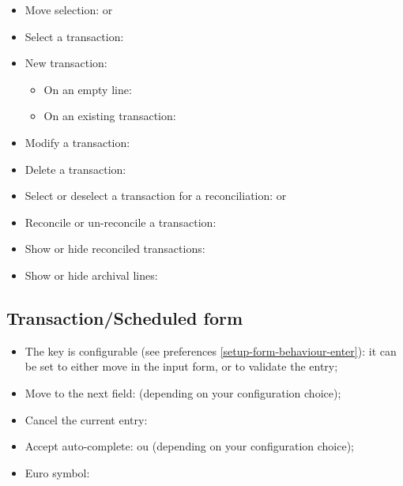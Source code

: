 \begin{itemize}
	\item Move selection: \keys{\arrowkeyup} or \keys{\arrowkeydown}%
	\item Select a transaction: %
	\item New transaction:%
	\begin{itemize}
		\item On an empty line: %
		\item On an existing transaction: %
	\end{itemize}
	\item Modify a transaction: %
	\item Delete a transaction: %
	\item Select or deselect a transaction for a reconciliation:  or %
	\item Reconcile or un-reconcile a transaction: %
	\item Show or hide reconciled transactions: %
	\item Show or hide archival lines: %
\end{itemize}


\subsection{Transaction/Scheduled form}%

\begin{itemize}
	\item The  key is configurable (see preferences \vref{setup-form-behaviour-enter}): it can be set to either move in the input form, or to validate the entry;
	\item Move to the next field:  (depending on your configuration choice);
	\item Cancel the current entry: \keys{\esc}%
	\item Accept auto-complete:  ou  (depending on your configuration choice);
	\item Euro symbol: %
\end{itemize}


